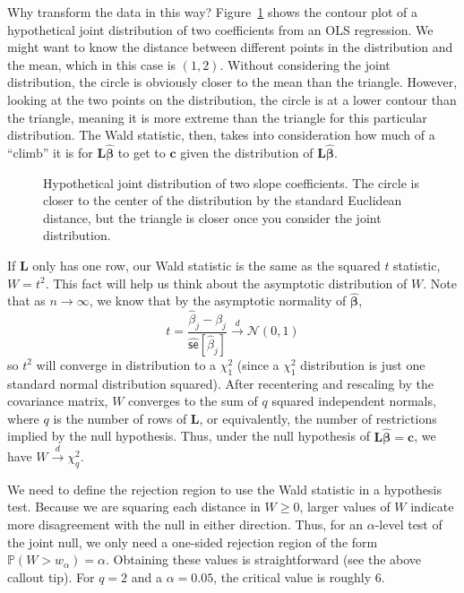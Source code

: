 \documentclass[
  13pt,
  letterpaper,
  DIV=11,
  numbers=noendperiod]{scrreprt}
\newcommand{\mb}{\symbf}
\newcommand{\N}{\mathcal{N}}
\newcommand{\se}{\textsf{se}}
\renewcommand{\P}{\mathbb{P}}
\newcommand{\bhat}{\widehat{\mb{\beta}}}
\newcommand{\indist}{\overset{d}{\to}}
\theoremstyle{plain}
\theoremstyle{definition}
\theoremstyle{definition}
\theoremstyle{remark}
\begin{document}
Why transform the data in this way? Figure~\ref{fig-wald} shows the
contour plot of a hypothetical joint distribution of two coefficients
from an OLS regression. We might want to know the distance between
different points in the distribution and the mean, which in this case is
\((1, 2)\). Without considering the joint distribution, the circle is
obviously closer to the mean than the triangle. However, looking at the
two points on the distribution, the circle is at a lower contour than
the triangle, meaning it is more extreme than the triangle for this
particular distribution. The Wald statistic, then, takes into
consideration how much of a ``climb'' it is for \(\mb{L}\bhat\) to get
to \(\mb{c}\) given the distribution of \(\mb{L}\bhat\).

\begin{figure}[th]


\caption{\label{fig-wald}Hypothetical joint distribution of two slope
coefficients. The circle is closer to the center of the distribution by
the standard Euclidean distance, but the triangle is closer once you
consider the joint distribution.}

\end{figure}%

If \(\mb{L}\) only has one row, our Wald statistic is the same as the
squared \(t\) statistic, \(W = t^2\). This fact will help us think about
the asymptotic distribution of \(W\). Note that as \(n\to\infty\), we
know that by the asymptotic normality of \(\bhat\), \[ 
t = \frac{\widehat{\beta}_{j} - \beta_{j}}{\widehat{\se}[\widehat{\beta}_{j}]} \indist \N(0,1)
\] so \(t^2\) will converge in distribution to a \(\chi^2_1\) (since a
\(\chi^2_1\) distribution is just one standard normal distribution
squared). After recentering and rescaling by the covariance matrix,
\(W\) converges to the sum of \(q\) squared independent normals, where
\(q\) is the number of rows of \(\mb{L}\), or equivalently, the number
of restrictions implied by the null hypothesis. Thus, under the null
hypothesis of \(\mb{L}\bhat = \mb{c}\), we have
\(W \indist \chi^2_{q}\).

We need to define the rejection region to use the Wald statistic in a
hypothesis test. Because we are squaring each distance in \(W \geq 0\),
larger values of \(W\) indicate more disagreement with the null in
either direction. Thus, for an \(\alpha\)-level test of the joint null,
we only need a one-sided rejection region of the form
\(\P(W > w_{\alpha}) = \alpha\). Obtaining these values is
straightforward (see the above callout tip). For \(q = 2\) and a
\(\alpha = 0.05\), the critical value is roughly 6.
\end{document}

